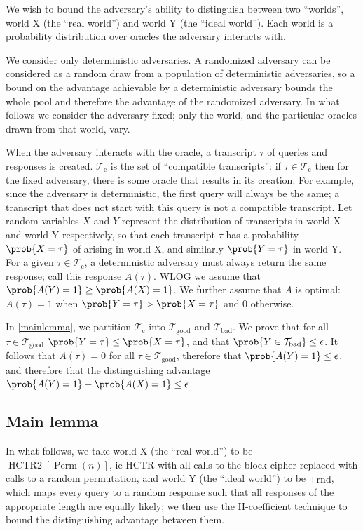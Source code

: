 \documentclass[letterpaper,11pt]{article}
\newcommand*{\Tb}{\mathcal{T}_\mathrm{bad}}
\newcommand*{\Tc}{\mathcal{T}_\mathrm{c}}
\newcommand*{\Tg}{\mathcal{T}_\mathrm{good}}
\DeclareMathOperator{\HCTR}{HCTR2}
\DeclareMathOperator{\Perm}{Perm}
\begin{document}
We wish to bound the adversary's ability to distinguish between
two ``worlds'', world X (the ``real world'') and world Y (the ``ideal world'').
Each world is a probability distribution over oracles the adversary
interacts with.

We consider only deterministic adversaries.
A randomized adversary can be considered as a random draw
from a population of deterministic adversaries, so
a bound on the advantage achievable by a deterministic
adversary bounds the whole pool and therefore
the advantage of the randomized adversary. In what follows
we consider the adversary fixed; only the world, and the
particular oracles drawn from that world, vary.

When the adversary interacts with the oracle,
a transcript \(\tau\) of queries and responses is created.
\(\Tc\) is the set of ``compatible transcripts'':
if \(\tau \in \Tc\) then for the fixed adversary,
there is some oracle
that results in its creation. For example,
since the adversary is deterministic, the first query
will always be the same; a transcript that
does not start with this query is not a compatible transcript.
Let random variables \(X\) and \(Y\)
represent the distribution of transcripts
in world X and world Y respectively, so that
each transcript \(\tau\) has a probability \(\prob{X = \tau}\)
of arising in world X, and similarly \(\prob{Y = \tau}\) in world Y.
For a given \(\tau \in \Tc\),
a deterministic adversary must always
return the same response; call this response \(A(\tau)\).
WLOG we assume that \(\prob{A(Y) = 1} \geq \prob{A(X) = 1}\).
We further assume that \(A\) is optimal:
\(A(\tau) = 1\)
when \(\prob{Y = \tau} > \prob{X = \tau}\) and 0 otherwise.

In \autoref{mainlemma}, we partition \(\Tc\) into \(\Tg\) and \(\Tb\). 
We prove that for all \(\tau \in \Tg\)
\(\prob{Y = \tau} \leq \prob{X = \tau}\),
and that \(\prob{Y \in \Tb} \leq \epsilon\).
It follows that \(A(\tau) = 0\) for all \(\tau \in \Tg\),
therefore that \(\prob{A(Y) = 1} \leq \epsilon\),
and therefore that the distinguishing advantage
\(\prob{A(Y) = 1} - \prob{A(X) = 1} \leq \epsilon\).

\subsection{Main lemma}\label{mainlemma}
In what follows, we take world X (the ``real world'') 
to be \(\HCTR[\Perm(n)]\),
ie HCTR with all calls to the block cipher
replaced with calls to a random permutation,
and world Y (the ``ideal world'') to be \(\pm\widetilde{\mathrm{rnd}}\),
which maps every query to a random response such that
all responses of the appropriate length are equally likely;
we then use the H-coefficient technique to bound
the distinguishing advantage between them.
\end{document}
